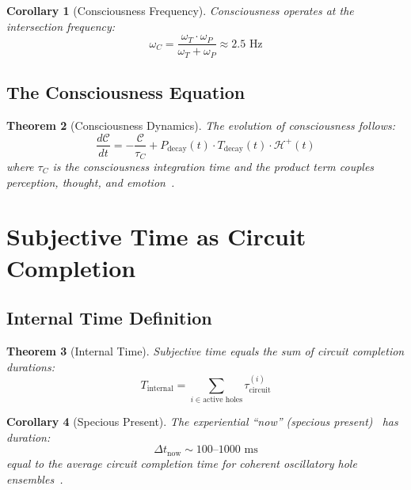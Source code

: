 \documentclass[aps,prd,twocolumn,superscriptaddress,floatfix,nofootinbib]{revtex4-2}
\newtheorem{theorem}{Theorem}[section]
\newtheorem{corollary}[theorem]{Corollary}
\theoremstyle{remark}
\newcommand{\Ccat}{\mathcal{C}}
\newcommand{\Hfield}{\mathcal{H}^+}
\newcommand{\Pdecay}{P_{\mathrm{decay}}}
\newcommand{\Tdecay}{T_{\mathrm{decay}}}
\begin{document}
\begin{corollary}[Consciousness Frequency]
\label{cor:consciousness_freq}
Consciousness operates at the intersection frequency:
\begin{equation}
\omega_C = \frac{\omega_T \cdot \omega_P}{\omega_T + \omega_P} \approx 2.5 \text{ Hz}
\end{equation}
\end{corollary}

\subsection{The Consciousness Equation}

\begin{theorem}[Consciousness Dynamics]
\label{thm:consciousness_dynamics}
The evolution of consciousness follows:
\begin{equation}
\frac{d\Ccat}{dt} = -\frac{\Ccat}{\tau_C} + \Pdecay(t) \cdot \Tdecay(t) \cdot \Hfield(t)
\end{equation}
where $\tau_C$ is the consciousness integration time and the product term couples perception, thought, and emotion~\cite{varela2001brainweb,fries2005mechanism}.
\end{theorem}

\section{Subjective Time as Circuit Completion}
\label{sec:time}

\subsection{Internal Time Definition}

\begin{theorem}[Internal Time]
\label{thm:internal_time}
Subjective time equals the sum of circuit completion durations:
\begin{equation}
T_{\text{internal}} = \sum_{i \in \text{active holes}} \tau_{\text{circuit}}^{(i)}
\end{equation}
\end{theorem}

\begin{corollary}[Specious Present]
\label{cor:specious}
The experiential ``now'' (specious present)~\cite{james1890principles,husserl1964phenomenology} has duration:
\begin{equation}
\Delta t_{\text{now}} \sim 100\text{--}1000 \text{ ms}
\end{equation}
equal to the average circuit completion time for coherent oscillatory hole ensembles~\cite{poppel1997temporal,buhusi2005time}.
\end{corollary}
\end{document}
